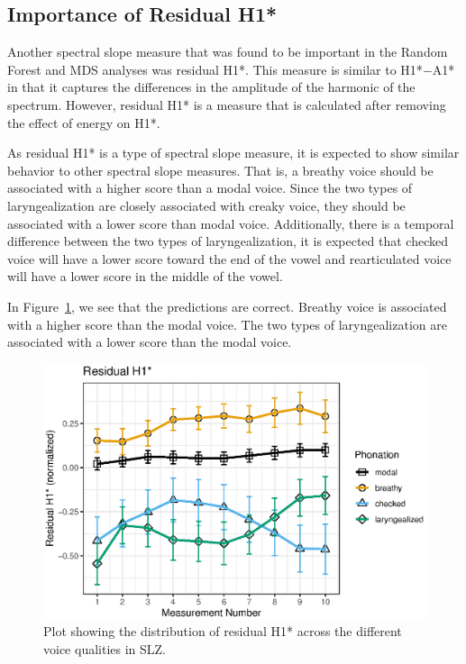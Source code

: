 \subsection{Importance of Residual H1*} \label{sec:rh1_discussion}

Another spectral slope measure that was found to be important in the Random Forest and MDS analyses was residual H1*. This measure is similar to H1*$-$A1* in that it captures the differences in the amplitude of the harmonic of the spectrum. However, residual H1* is a measure that is calculated after removing the effect of energy on H1*. 

As residual H1* is a type of spectral slope measure, it is expected to show similar behavior to other spectral slope measures. That is, a breathy voice should be associated with a higher score than a modal voice. Since the two types of laryngealization are closely associated with creaky voice, they should be associated with a lower score than modal voice. Additionally, there is a temporal difference between the two types of laryngealization, it is expected that checked voice will have a lower score toward the end of the vowel and rearticulated voice will have a lower score in the middle of the vowel. 

In Figure~\ref{fig:residualH1}, we see that the predictions are correct. Breathy voice is associated with a higher score than the modal voice. The two types of laryngealization are associated with a lower score than the modal voice.

\begin{figure}[h!]
    \centering
    \includegraphics[width = 0.9\linewidth]{images/slz_residual_h1c.eps}
    \caption{Plot showing the distribution of residual H1* across the different voice qualities in SLZ.}
    \label{fig:residualH1}
\end{figure}

